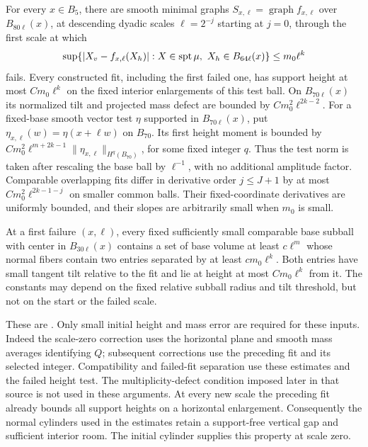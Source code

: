 \begin{lemma}\label{lem:local-fits}
For every $x\in B_5$, there are smooth minimal graphs
$S_{x,\ell}=\operatorname{graph}f_{x,\ell}$ over $B_{80\ell}(x)$,
at descending dyadic scales $\ell=2^{-j}$ starting at $j=0$, through
the first scale at which
\[
 \sup\{|X_v-f_{x,\ell}(X_h)|:
          X\in\operatorname{spt}\mu,\ X_h\in B_{64\ell}(x)\}
                                  \le m_0\ell^k
\]
fails. Every constructed fit, including the first failed one, has
support height at most $Cm_0\ell^k$ on the fixed interior enlargements
of this test ball. On $B_{70\ell}(x)$ its normalized tilt and projected
mass defect are bounded by $Cm_0^2\ell^{2k-2}$.
For a fixed-base smooth vector test $\eta$ supported in
$B_{70\ell}(x)$, put $\eta_{x,\ell}(w)=\eta(x+\ell w)$ on
$B_{70}$. Its first height moment is bounded by
$Cm_0^2\ell^{m+2k-1}\|\eta_{x,\ell}\|_{H^q(B_{70})}$,
for some fixed integer $q$. Thus the test norm is taken after rescaling
the base ball by $\ell^{-1}$, with no additional amplitude factor.
Comparable overlapping fits differ in derivative
order $j\le J+1$ by at most $Cm_0^2\ell^{2k-1-j}$ on smaller common
balls. Their fixed-coordinate derivatives are uniformly bounded, and
their slopes are arbitrarily small when $m_0$ is small.

At a first failure $(x,\ell)$, every fixed sufficiently small comparable
base subball with center in $B_{30\ell}(x)$ contains a set of base
volume at least $c\ell^m$ whose normal fibers contain two entries
separated by at least $cm_0\ell^k$. Both entries have small tangent tilt
relative to the fit and lie at height at most $Cm_0\ell^k$ from it.
The constants may depend on the fixed relative subball radius and tilt
threshold, but not on the start or the failed scale.
\end{lemma}

These are \cite[Lemmas~7.1--7.2 and Equations~(7.7)--(7.8)]{AE}.
Only small initial height and mass error are required for these inputs.
Indeed the scale-zero correction uses the horizontal plane and smooth
mass averages identifying $Q$; subsequent corrections use the preceding
fit and its selected integer. Compatibility and failed-fit separation
use these estimates and the failed height test. The multiplicity-defect
condition imposed later in that source is not used in these arguments.
At every new scale the preceding fit already bounds all support heights
on a horizontal enlargement. Consequently the normal cylinders used
in the estimates retain a support-free vertical gap and sufficient
interior room. The initial cylinder supplies this property at scale zero.

